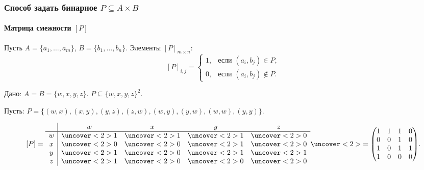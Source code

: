 \begin{frame}
    \frametitle{Способ задать бинарное $P\subseteq A\times B$}
    \framesubtitle{Матрица смежности $[P]$}
    
    Пусть $A=\{a_1,\ldots,a_m\}$, $B=\{b_1,\ldots,b_n\}$. Элементы $[P]_{m\times n}$:
    \[
        [P]_{i,j}=
        \begin{cases}
            1,  &\text{если $(a_i,b_j)\in P$},\\
            0,  &\text{если $(a_i,b_j)\not\in P$}.
        \end{cases}
    \]
    
    \begin{example}
        Дано: $A=B=\{w,x,y,z\}$. $P\subseteq \{w,x,y,z\}^2$.
        
        Пусть: $P=\{(w,x),(x,y),(y,z),(z,w),(w,y),(y,w),(w,w),(y,y)\}$.
    \end{example}
    
    \[
        [P]=
        \begin{array}{c|cccc}
             &            w &            x &            y &            z \\ \hline
            w&\uncover<2>{1}&\uncover<2>{1}&\uncover<2>{1}&\uncover<2>{0}\\
            x&\uncover<2>{0}&\uncover<2>{0}&\uncover<2>{1}&\uncover<2>{0}\\
            y&\uncover<2>{1}&\uncover<2>{0}&\uncover<2>{1}&\uncover<2>{1}\\
            z&\uncover<2>{1}&\uncover<2>{0}&\uncover<2>{0}&\uncover<2>{0}
        \end{array}
        \uncover<2>{=
            \begin{pmatrix}
                1&1&1&0 \\
                0&0&1&0 \\
                1&0&1&1 \\
                1&0&0&0
            \end{pmatrix}
        }.
    \]
\end{frame}
    
